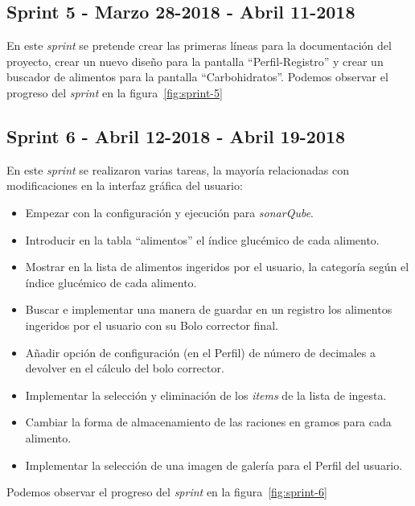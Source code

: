 \subsection{Sprint 5 - Marzo 28-2018 - Abril 11-2018}
En este \textit{sprint} se pretende crear las primeras líneas para la documentación del proyecto, crear un nuevo diseño para la pantalla ``Perfil-Registro'' y crear un buscador de alimentos para la pantalla ``Carbohidratos''.
Podemos observar el progreso del \textit{sprint} en la figura~\ref{fig:sprint-5}
\subsection{Sprint 6 - Abril 12-2018 - Abril 19-2018}
En este \textit{sprint} se realizaron varias tareas, la mayoría relacionadas con modificaciones en la interfaz gráfica del usuario:
\begin{itemize}
	\item Empezar con la configuración y ejecución para \textit{sonarQube}.
	\item Introducir en la tabla ``alimentos'' el índice glucémico de cada alimento.
	\item Mostrar en la lista de alimentos ingeridos por el usuario, la categoría según el índice glucémico de cada alimento.
	\item Buscar e implementar una manera de guardar en un registro los alimentos ingeridos por el usuario con su Bolo corrector final.
	\item Añadir opción de configuración (en el Perfil) de número de decimales a devolver en el cálculo del bolo corrector.
	\item Implementar la selección y eliminación de los \textit{items} de la lista de ingesta.
	\item Cambiar la forma de almacenamiento de las raciones en gramos para cada alimento.
	\item Implementar la selección de una imagen de galería para el Perfil del usuario.
\end{itemize}
Podemos observar el progreso del \textit{sprint} en la figura~\ref{fig:sprint-6}
